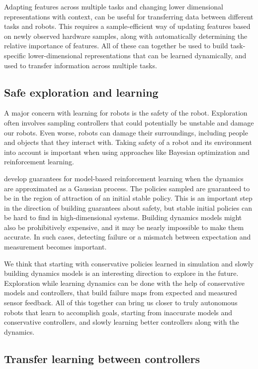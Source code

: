 Adapting features across multiple tasks and changing lower dimensional representations with context, can be useful for transferring data between different tasks and robots. This requires a sample-efficient way of updating features based on newly observed hardware samples, along with automatically determining the relative importance of features. All of these can together be used to build task-specific lower-dimensional representations that can be learned dynamically, and used to transfer information across multiple tasks.


\subsection{Safe exploration and learning}

A major concern with learning for robots is the safety of the robot. Exploration often involves sampling controllers that could potentially be unstable and damage our robots. Even worse, robots can damage their surroundings, including people and objects that they interact with. Taking safety of a robot and its environment into account is important when using approaches like Bayesian optimization and reinforcement learning.

\cite{berkenkamp2017safe} develop guarantees for model-based reinforcement learning when the dynamics are approximated as a Gaussian process. The policies sampled are guaranteed to be in the region of attraction of an initial stable policy. This is an important step in the direction of building guarantees about safety, but stable initial policies can be hard to find in high-dimensional systems. Building dynamics models might also be prohibitively expensive, and it may be nearly impossible to make them accurate. In such cases, detecting failure or a mismatch between expectation and measurement becomes important. 

We think that starting with conservative policies learned in simulation and slowly building dynamics models is an interesting direction to explore in the future. Exploration while learning dynamics can be done with the help of conservative models and controllers, that build failure maps from expected and measured sensor feedback. All of this together can bring us closer to truly autonomous robots that learn to accomplish goals, starting from inaccurate models and conservative controllers, and slowly learning better controllers along with the dynamics.

\subsection{Transfer learning between controllers}

